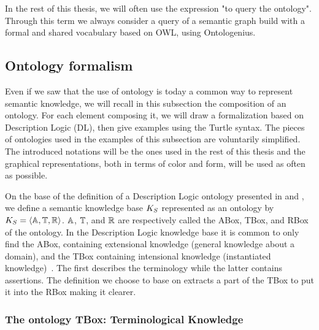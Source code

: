 In the rest of this thesis, we will often use the expression "to query the ontology". Through this term we always consider a query of a semantic graph build with a formal and shared vocabulary based on OWL, using Ontologenius.

\subsection{Ontology formalism}
\label{sec:kb_formalism}

Even if we saw that the use of ontology is today a common way to represent semantic knowledge, we will recall in this subsection the composition of an ontology. For each element composing it, we will draw a formalization based on Description Logic (DL), then give examples using the Turtle syntax. The pieces of ontologies used in the examples of this subsection are voluntarily simplified. The introduced notations will be the ones used in the rest of this thesis and the graphical representations, both in terms of color and form, will be used as often as possible.

On the base of the definition of a Description Logic ontology presented in \cite{fokoue_2006_summary} and \cite{krotzsch_2013_description}, we define a semantic knowledge base $K_S$ represented as an ontology by  $K_S = \langle \mathbb{A}, \mathbb{T}, \mathbb{R} \rangle$. $\mathbb{A}$, $\mathbb{T}$, and $\mathbb{R}$ are respectively called the ABox, TBox, and RBox of the ontology. In the Description Logic knowledge base it is common to only find the ABox, containing extensional knowledge (general knowledge about a domain), and the TBox containing intensional knowledge (instantiated knowledge)~\cite{baader_2003_description}. The first describes the terminology while the latter contains assertions. The definition we choose to base on extracts a part of the TBox to put it into the RBox making it clearer.

\subsubsection{The ontology TBox: Terminological Knowledge}

